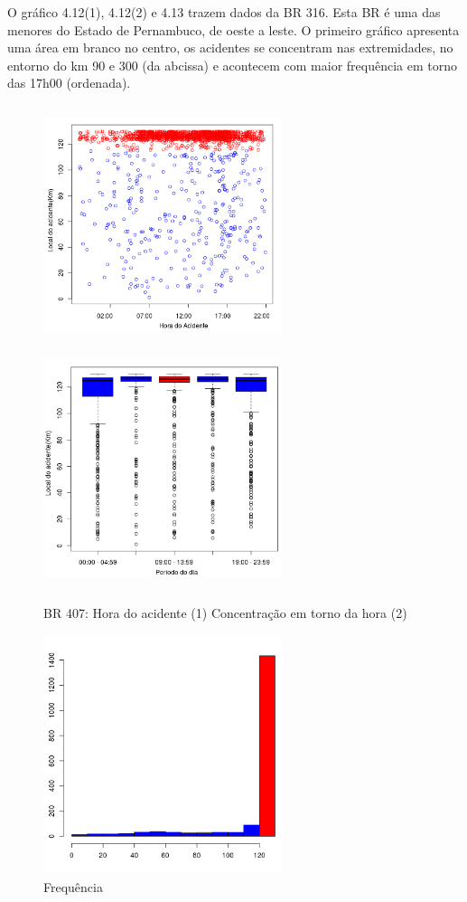 O gráfico 4.12(1), 4.12(2)  e 4.13 trazem dados da BR 316. Esta BR é uma das menores do Estado de Pernambuco, de oeste a leste. O primeiro gráfico apresenta uma área em branco no centro, os acidentes se concentram nas extremidades, no entorno do km 90 e 300 (da abcissa) e acontecem com maior frequência em torno das 17h00 (ordenada).

\pagebreak

\begin{figure}[h]
	\caption{BR 407: Hora do acidente (1) Concentração em torno da hora (2)}
	\includegraphics[width=7cm,height=7cm]{Figuras/Preprocess/br407_1.png}
	\includegraphics[width=7cm,height=7cm]{Figuras/Preprocess/br407_3.png}

\end{figure}

\quad
\begin{figure}[h]
	\centering
	\caption{ Frequência}
	\includegraphics[width=7cm,height=7cm]{Figuras/Preprocess/br407_2.png}
\end{figure}

